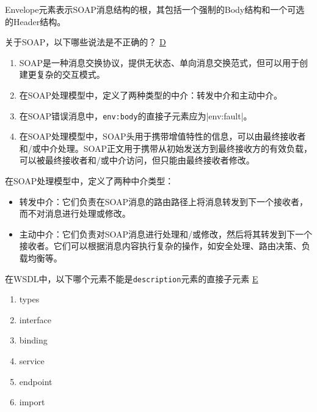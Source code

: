 \begin{solution}
Envelope元素表示SOAP消息结构的根，其包括一个强制的Body结构和一个可选的Header结构。
\end{solution}




\begin{problem}
关于SOAP，以下哪些说法是不正确的？
\uline{D}
    \begin{enumerate}[label=\Alph*.]
        \item SOAP是一种消息交换协议，提供无状态、单向消息交换范式，但可以用于创建更复杂的交互模式。
        \item 在SOAP处理模型中，定义了两种类型的中介：转发中介和主动中介。
        \item 在SOAP错误消息中，\verb|env:body|\;的直接子元素应为\sverb|env:fault|。
        \item 在SOAP处理模型中，SOAP头用于携带增值特性的信息，可以由最终接收者和/或中介处理。SOAP正文用于携带从初始发送方到最终接收方的有效负载，可以被最终接收者和/或中介访问，但只能由最终接收者修改。
    \end{enumerate}
\end{problem}

\begin{solution}
在SOAP处理模型中，定义了两种中介类型：
\begin{itemize}
    \item 转发中介：它们负责在SOAP消息的路由路径上将消息转发到下一个接收者，而不对消息进行处理或修改。
    \item 主动中介：它们负责对SOAP消息进行处理和/或修改，然后将其转发到下一个接收者。它们可以根据消息内容执行复杂的操作，如安全处理、路由决策、负载均衡等。
\end{itemize}
\end{solution}


\begin{problem}
在WSDL中，以下哪个元素不能是\;\verb|description|\;元素的直接子元素
\uline{E}
\vspace{-0.8em}
\begin{multicols}{6}
    \begin{enumerate}[label=\Alph*.]
        \item types
        \item interface
        \item binding
        \item service
        \item endpoint
        \item import
    \end{enumerate}
\end{multicols}
\vspace{-1em}
\end{problem}

